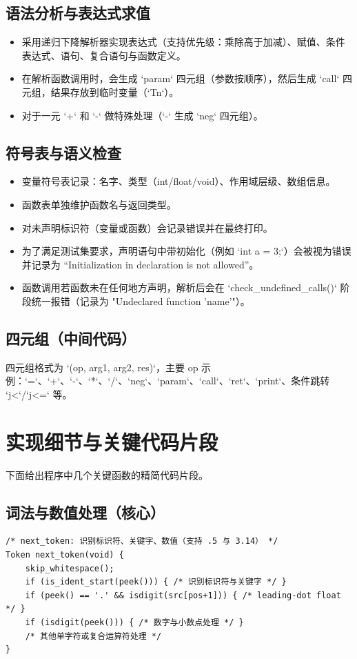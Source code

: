 \documentclass[12pt,a4paper]{ctexart}
\begin{document}
\subsection{语法分析与表达式求值}
\begin{itemize}
	\item 采用递归下降解析器实现表达式（支持优先级：乘除高于加减）、赋值、条件表达式、语句、复合语句与函数定义。
	\item 在解析函数调用时，会生成 `param` 四元组（参数按顺序），然后生成 `call` 四元组，结果存放到临时变量（`Tn`）。
	\item 对于一元 `+` 和 `-` 做特殊处理（`-` 生成 `neg` 四元组）。
\end{itemize}

\subsection{符号表与语义检查}
\begin{itemize}
	\item 变量符号表记录：名字、类型（int/float/void）、作用域层级、数组信息。
	\item 函数表单独维护函数名与返回类型。
	\item 对未声明标识符（变量或函数）会记录错误并在最终打印。
	\item 为了满足测试集要求，声明语句中带初始化（例如 `int a = 3;`）会被视为错误并记录为 “Initialization in declaration is not allowed”。
	\item 函数调用若函数未在任何地方声明，解析后会在 `check\_undefined\_calls()` 阶段统一报错（记录为 "Undeclared function 'name'"）。
\end{itemize}

\subsection{四元组（中间代码）}
四元组格式为 `(op, arg1, arg2, res)`，主要 op 示例：`=`、`+`、`-`、`*`、`/`、`neg`、`param`、`call`、`ret`、`print`、条件跳转 `j<`/`j<=` 等。

\section{实现细节与关键代码片段}
下面给出程序中几个关键函数的精简代码片段。

\subsection{词法与数值处理（核心）}
\begin{lstlisting}
/* next_token: 识别标识符、关键字、数值（支持 .5 与 3.14） */
Token next_token(void) {
	skip_whitespace();
	if (is_ident_start(peek())) { /* 识别标识符与关键字 */ }
	if (peek() == '.' && isdigit(src[pos+1])) { /* leading-dot float */ }
	if (isdigit(peek())) { /* 数字与小数点处理 */ }
	/* 其他单字符或复合运算符处理 */
}
\end{lstlisting}
\end{document}
